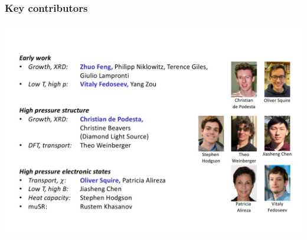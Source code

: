 
\begin{frame}[plain,label=Conc]
\frametitle {Key contributors}
\includegraphics[width=1.25\textwidth]{GroupList}
\end{frame}


